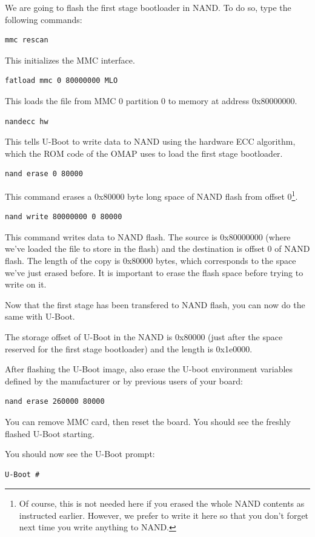 We are going to flash the first stage bootloader in NAND. To do so,
type the following commands:

\begin{verbatim}
mmc rescan
\end{verbatim}

This initializes the MMC interface.

\begin{verbatim}
fatload mmc 0 80000000 MLO
\end{verbatim}
This loads the file from MMC 0 partition 0 to memory at address
0x80000000.

\begin{verbatim}
nandecc hw
\end{verbatim}

This tells U-Boot to write data to NAND using the hardware ECC
algorithm, which the ROM code of the OMAP uses to load the first stage
bootloader.

\begin{verbatim}
nand erase 0 80000
\end{verbatim}

This command erases a 0x80000 byte long space of NAND flash from
offset 0\footnote{Of course, this is not needed here if you erased the
  whole NAND contents as instructed earlier. However, we prefer to
  write it here so that you don't forget next time you write anything
  to NAND.}.

\begin{verbatim}
nand write 80000000 0 80000
\end{verbatim}

This command writes data to NAND flash. The source is 0x80000000
(where we've loaded the file to store in the flash) and the
destination is offset 0 of NAND flash. The length of the copy is
0x80000 bytes, which corresponds to the space we've just erased
before. It is important to erase the flash space before trying to
write on it.

Now that the first stage has been transfered to NAND flash, you can
now do the same with U-Boot.

The storage offset of U-Boot in the NAND is 0x80000 (just after the
space reserved for the first stage bootloader) and the length is
0x1e0000.

After flashing the U-Boot image, also erase the U-boot environment
variables defined by the manufacturer or by previous users of your
board:

\begin{verbatim}
nand erase 260000 80000
\end{verbatim}

You can remove MMC card, then reset the board. You should see the
freshly flashed U-Boot starting.

You should now see the U-Boot prompt:

\begin{verbatim}
U-Boot #
\end{verbatim}

\clearpage


